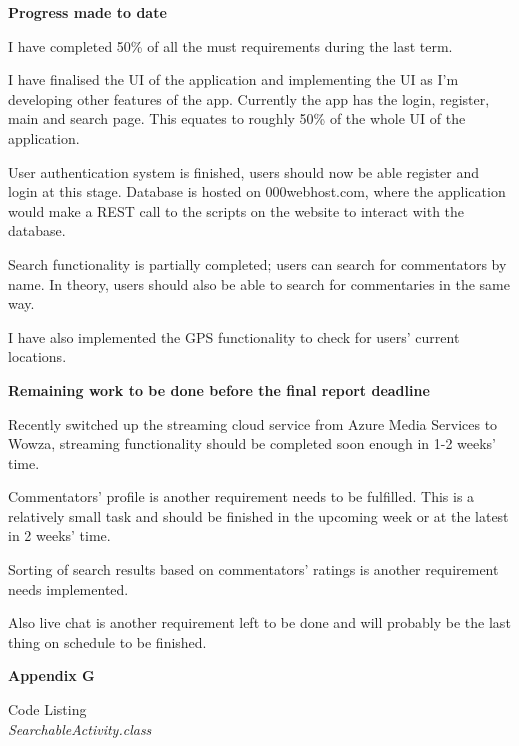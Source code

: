 \documentclass{article}
\begin{document}
\begin{flushleft}
{\large \textbf{Progress made to date}}\par
I have completed 50\% of all the must requirements during the last term.\par
I have finalised the UI of the application and implementing the UI as I’m developing other features of the app. Currently the app has the login, register, main and search page. This equates to roughly 50\% of the whole UI of the application.\par
User authentication system is finished, users should now be able register and login at this stage. Database is hosted on 000webhost.com, where the application would make a REST call to the scripts on the website to interact with the database.\par
Search functionality is partially completed; users can search for commentators by name. In theory, users should also be able to search for commentaries in the same way.\par
I have also implemented the GPS functionality to check for users’ current locations.\par
{\large \textbf{Remaining work to be done before the final report deadline}}\par
Recently switched up the streaming cloud service from Azure Media Services to Wowza, streaming functionality should be completed soon enough in 1-2 weeks’ time.\par
Commentators’ profile is another requirement needs to be fulfilled. This is a relatively small task and should be finished in the upcoming week or at the latest in 2 weeks’ time.\par
Sorting of search results based on commentators’ ratings is another requirement needs implemented.\par
Also live chat is another requirement left to be done and will probably be the last thing on schedule to be finished.\par
{\Large \textbf{Appendix G}}\par
{\huge Code Listing}\\
{\large \textit{SearchableActivity.class}}
\end{flushleft}
\end{document}
